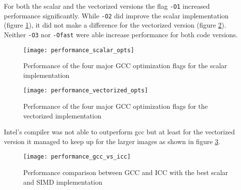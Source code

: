 For both the scalar and the vectorized versions the flag \texttt{-O1} increased
performance significantly. While \texttt{-O2} did improve the scalar
implementation (figure \ref{fig:perf_scal}), it did not make a difference for
the vectorized version (figure \ref{fig:perf_vec}). Neither \texttt{-O3} nor
\texttt{-Ofast} were able increase performance for both code versions.

\begin{figure}[H]
  \centering
  \texttt{[image: performance\_scalar\_opts]}
  \caption{Performance of the four major GCC optimization flags for the scalar implementation}
  \label{fig:perf_scal}
\end{figure}

\begin{figure}[H]
    \centering
    \texttt{[image: performance\_vectorized\_opts]}
    \caption{Performance of the four major GCC optimization flags for the vectorized implementation}
    \label{fig:perf_vec}
  \end{figure}



Intel's compiler was not able to outperform gcc but at least for the vectorized
version it managed to keep up for the larger images as shown in figure
\ref{fig:perf_gcc_vs_icc}.

\begin{figure}[H]
  \centering
  \texttt{[image: performance\_gcc\_vs\_icc]}
  \caption{Performance comparison between GCC and ICC with the best scalar and
    SIMD implementation}
  \label{fig:perf_gcc_vs_icc}
\end{figure}

